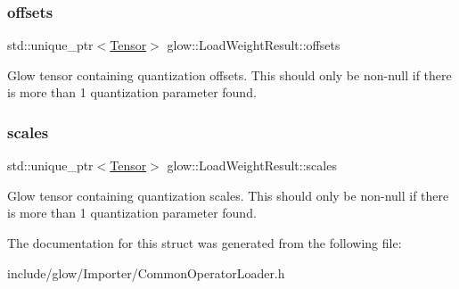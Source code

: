 \subsubsection{\texorpdfstring{offsets}{offsets}}
{\footnotesize\ttfamily std\+::unique\+\_\+ptr$<$\hyperlink{classglow_1_1_tensor}{Tensor}$>$ glow\+::\+Load\+Weight\+Result\+::offsets}

Glow tensor containing quantization offsets. This should only be non-\/null if there is more than 1 quantization parameter found. \mbox{\label{structglow_1_1_load_weight_result_a65c468e00429585f1955b4b0373537e7}} 
\subsubsection{\texorpdfstring{scales}{scales}}
{\footnotesize\ttfamily std\+::unique\+\_\+ptr$<$\hyperlink{classglow_1_1_tensor}{Tensor}$>$ glow\+::\+Load\+Weight\+Result\+::scales}

Glow tensor containing quantization scales. This should only be non-\/null if there is more than 1 quantization parameter found. 

The documentation for this struct was generated from the following file\+:\begin{DoxyCompactItemize}
\item 
include/glow/\+Importer/Common\+Operator\+Loader.\+h\end{DoxyCompactItemize}

